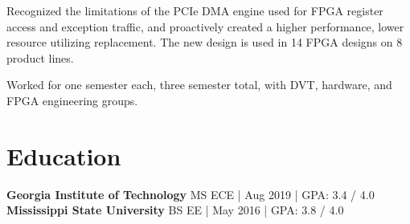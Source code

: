 \documentclass[10pt]{deedy-resume-reversed}
\begin{document}
\begin{minipage}[t]{1.0\textwidth}
\begin{tightemize}
\item Recognized the limitations of the PCIe DMA engine used for FPGA register access and exception traffic,
and proactively created a higher performance, lower resource utilizing replacement. The new design is used in 14 FPGA designs on 8 product lines.
\end{tightemize}
\sectionsep

\begin{tightemize}
\item Worked for one semester each, three semester total, with DVT, hardware, and FPGA engineering groups.
\end{tightemize}
\sectionsep



\section{Education}
\textbf{Georgia Institute of Technology} MS ECE | Aug 2019 | GPA: 3.4 / 4.0 \\
\textbf{Mississippi State University} BS EE | May 2016 | GPA: 3.8 / 4.0 \\
\sectionsep

\end{minipage}
\end{document}
